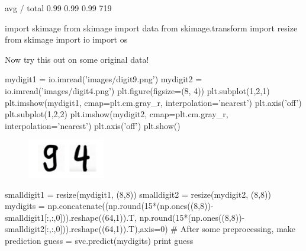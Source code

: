 \begin{example}
\begin{ipythonnbout}[3]
avg / total       0.99      0.99      0.99       719
\end{ipythonnbout}

\begin{ipythonnb}[4]
import skimage
from skimage import data
from skimage.transform import resize
from skimage import io
import os
\end{ipythonnb}

Now try this out on some original data!

\begin{ipythonnb}[5]
mydigit1 = io.imread('images/digit9.png')
mydigit2 = io.imread('images/digit4.png')
plt.figure(figsize=(8, 4))
plt.subplot(1,2,1)
plt.imshow(mydigit1, cmap=plt.cm.gray_r, interpolation='nearest')
plt.axis('off')
plt.subplot(1,2,2)
plt.imshow(mydigit2, cmap=plt.cm.gray_r, interpolation='nearest')
plt.axis('off')
plt.show()
\end{ipythonnb}

\begin{figure}[h!]
\centering
\includegraphics[width=0.3\textwidth]{images/digits94.png}
\end{figure}

\begin{ipythonnb}[6]
smalldigit1 = resize(mydigit1, (8,8))
smalldigit2 = resize(mydigit2, (8,8))
mydigits = np.concatenate((np.round(15*(np.ones((8,8))-
			smalldigit1[:,:,0])).reshape((64,1)).T,
            np.round(15*(np.ones((8,8))-
            smalldigit2[:,:,0])).reshape((64,1)).T),axis=0)
# After some preprocessing, make prediction
guess = svc.predict(mydigits)
print guess
\end{ipythonnb}

\begin{ipythonnboutno}
[9 4]
\end{ipythonnboutno}

\end{example}

